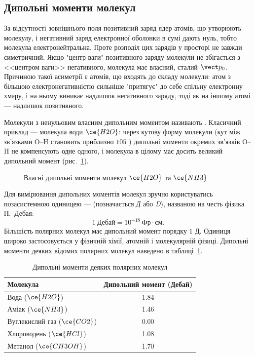 \subsection*{Дипольні моменти молекул}

За відсутності зовнішнього поля позитивний заряд ядер атомів, що утворюють молекулу, і негативний заряд електронної оболонки в сумі дають нуль, тобто
молекула електронейтральна. Проте розподіл цих зарядів у просторі не завжди симетричний. Якщо "центр ваги" позитивного заряду молекули не збігається
з <<центром ваги>> негативного, молекула має власний, сталий  $\vect p_0$. Причиною такої асиметрії є  атомів, що входять до складу молекули: атом з більшою електронегативністю сильніше "притягує" до себе спільну електронну
хмару, і на ньому виникає надлишок негативного заряду, тоді як на іншому атомі --- надлишок позитивного.

Молекули з ненульовим власним дипольним моментом називають . Класичний приклад --- молекула води $\ce{H2O}$: через кутову форму
молекули (кут між зв'язками O--H становить приблизно $105^\circ$) дипольні моменти окремих зв'язків O--H не компенсують одне одного, і молекула в
цілому має досить великий дипольний момент (рис.~\ref{pic:MoleculeDipoles}).

\begin{figure}[h!]\centering
	\caption{Власні дипольні моменти молекул $\ce{H2O}$ та $\ce{NH3}$\label{pic:MoleculeDipoles}}
\end{figure}

Для вимірювання дипольних моментів молекул зручно користуватись позасистемною одиницею ---  (позначається \textit{Д} або \textit{D}),
названою на честь фізика П.~Дебая:
\begin{equation*}
	1\ \text{Дебай} = 10^{-18}\ \text{Фр}\cdot\text{см}.
\end{equation*}
Більшість полярних молекул має дипольний момент порядку $1$ Д. Одиниця широко застосовується у фізичній хімії, атомній і молекулярній фізиці.
Дипольні моменти деяких відомих полярних молекул наведено в таблиці~\ref{tab:dipoles}.

\begin{table}[h!]
	\centering
	\caption{Дипольні моменти деяких полярних молекул\label{tab:dipoles}}
	\begin{tabular}{lc}
		\toprule
		Молекула                    & Дипольний момент (Дебай) \\
		\midrule
		Вода ($\ce{H2O}$)           & 1.84                      \\
		Аміак ($\ce{NH3}$)          & 1.46                      \\
		Вуглекислий газ ($\ce{CO2}$) & 0.00                     \\
		Хлороводень ($\ce{HCl}$)    & 1.08                      \\
		Метанол ($\ce{CH3OH}$)      & 1.70                      \\
		\bottomrule
	\end{tabular}
\end{table}

